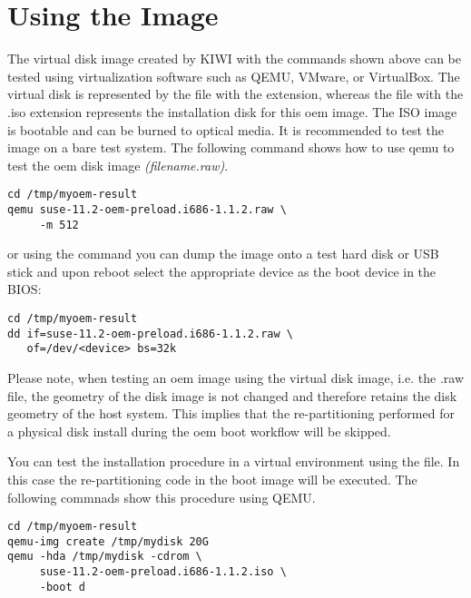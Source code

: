 \section{Using the Image}

The virtual disk image created by KIWI with the commands shown above can be 
tested using virtualization software such as QEMU, VMware, or VirtualBox. 
The virtual disk is represented by the file with the  extension, whereas 
the file with the .iso extension represents the installation disk for this oem
image. The ISO image is bootable  and can be burned to 
optical media. It is recommended to test the image on a bare test system. The 
following command shows how to use qemu to test the oem disk image 
\textit{(filename.raw)}.

\begin{Command}{12cm}
\begin{verbatim}
cd /tmp/myoem-result
qemu suse-11.2-oem-preload.i686-1.1.2.raw \
     -m 512
\end{verbatim}
\end{Command}

or using the  command you can dump the image onto a test hard 
disk or USB stick and upon reboot select the appropriate device as the 
boot device in the BIOS:

\begin{Command}{12cm}
\begin{verbatim}
cd /tmp/myoem-result
dd if=suse-11.2-oem-preload.i686-1.1.2.raw \
   of=/dev/<device> bs=32k
\end{verbatim}
\end{Command}

Please note, when testing an oem image using the virtual disk image, i.e. 
the .raw file, the geometry of the disk image is not changed and therefore 
retains the disk geometry of the host system. This implies that the 
re-partitioning performed for a physical disk install during the oem boot 
workflow will be skipped.

You can test the installation procedure in a virtual environment using
the  file. In this case the re-partitioning code in the boot image will
be executed. The following commnads show this procedure using QEMU.

\begin{Command}{12cm}
\begin{verbatim}
cd /tmp/myoem-result
qemu-img create /tmp/mydisk 20G
qemu -hda /tmp/mydisk -cdrom \
     suse-11.2-oem-preload.i686-1.1.2.iso \
     -boot d
\end{verbatim}
\end{Command}

